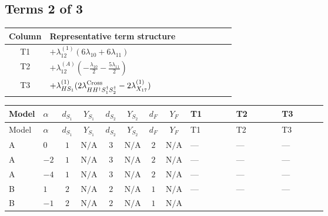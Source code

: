 \documentclass[8pt]{article}
\begin{document}
\begin{landscape}
\subsection*{Terms 2 of 3}
\begin{center}
\begin{tabular}{@{}c >{\raggedright\arraybackslash}p{0.82\linewidth}@{}}
\toprule
Column & Representative term structure \\
\midrule
T1 & \(\displaystyle +{\lambda_{12}^{(1)}} (6 {\lambda_{10}}+6 {\lambda_{11}})\) \\
\midrule
T2 & \(\displaystyle +{\lambda_{12}^{(A)}} \left(-\frac{{\lambda_{10}}}{2}-\frac{5 {\lambda_{11}}}{2}\right)\) \\
\midrule
T3 & \(\displaystyle +{\lambda_{HS_1}^{(1)}} (2 {\lambda_{H H^\dagger S_1^\dagger S_2^\dagger}^{\rm Cross}}-2 {\lambda_{X_{17}}^{(1)}})\) \\
\midrule
\bottomrule
\end{tabular}
\end{center}
\smallskip
\tiny
\begin{longtable}{@{}llcccccc >{\raggedright\arraybackslash}p{0.21\linewidth} >{\raggedright\arraybackslash}p{0.21\linewidth} >{\raggedright\arraybackslash}p{0.21\linewidth}@{}}
\toprule
Model & $\alpha$ & $d_{S_1}$ & $Y_{S_1}$ & $d_{S_2}$ & $Y_{S_2}$ & $d_F$ & $Y_F$ & T1 & T2 & T3 \\
\midrule
\endfirsthead
\toprule
Model & $\alpha$ & $d_{S_1}$ & $Y_{S_1}$ & $d_{S_2}$ & $Y_{S_2}$ & $d_F$ & $Y_F$ & T1 & T2 & T3 \\
\midrule
\endhead
A & $0$ & $1$ & $\text{N/A}$ & $3$ & $\text{N/A}$ & $2$ & $\text{N/A}$ & --- & --- & --- \\
\midrule
A & $-2$ & $1$ & $\text{N/A}$ & $3$ & $\text{N/A}$ & $2$ & $\text{N/A}$ & --- & --- & --- \\
\midrule
A & $-4$ & $1$ & $\text{N/A}$ & $3$ & $\text{N/A}$ & $2$ & $\text{N/A}$ & --- & --- & --- \\
\midrule
B & $1$ & $2$ & $\text{N/A}$ & $2$ & $\text{N/A}$ & $1$ & $\text{N/A}$ & --- & --- & --- \\
\midrule
B & $-1$ & $2$ & $\text{N/A}$ & $2$ & $\text{N/A}$ & $1$ & $\text{N/A}$ & \scriptsize\adjustbox{max width=\linewidth}{$\begin{gathered} +{\lambda_{12}^{(1)}} (6 {\lambda_{10}}+6 {\lambda_{11}})\end{gathered}$} & \scriptsize\adjustbox{max width=\linewidth}{$\begin{gathered} +{\lambda_{12}^{(A)}} \left(-\frac{{\lambda_{10}}}{2}-\frac{5 {\lambda_{11}}}{2}\right)\end{gathered}$} & \scriptsize\adjustbox{max width=\linewidth}{$\begin{gathered} +{\lambda_{HS_1}^{(1)}} (2 {\lambda_{H H^\dagger S_1^\dagger S_2^\dagger}^{\rm Cross}}-2 {\lambda_{X_{17}}^{(1)}})\end{gathered}$} \\

\end{longtable}
\end{landscape}
\end{document}
